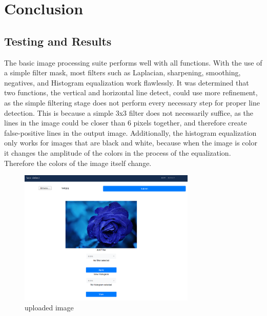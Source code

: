 \documentclass{article}
\let\Oldsection\section
\renewcommand{\section}{\FloatBarrier\Oldsection}
\let\Oldsubsection\subsection
\renewcommand{\subsection}{\FloatBarrier\Oldsubsection}
\begin{document}
  \newpage

  \section{Conclusion}

  \subsection{Testing and Results}

  The basic image processing suite performs well with all functions. With the use of a simple filter mask, most filters such as Laplacian, sharpening, smoothing, negatives, and Histogram equalization work flawlessly. It was determined that two functions, the vertical and horizontal line detect, could use more refinement, as the simple filtering stage does not perform every necessary step for proper line detection. This is because a simple 3x3 filter does not necessarily suffice, as the lines in the image could be closer than 6 pixels together, and therefore create false-positive lines in the output image. Additionally, the histogram equalization only works for images that are black and white, because when the image is color it changes the amplitude of the colors in the process of the equalization. Therefore the colors of the image itself change.

  \begin{figure}[!htb]
    \centering
    \includegraphics[width=0.75\textwidth]{assets/image_uploaded.png}
    \caption{uploaded image}
    \label{fig:image-uploaded}
  \end{figure}
\end{document}
